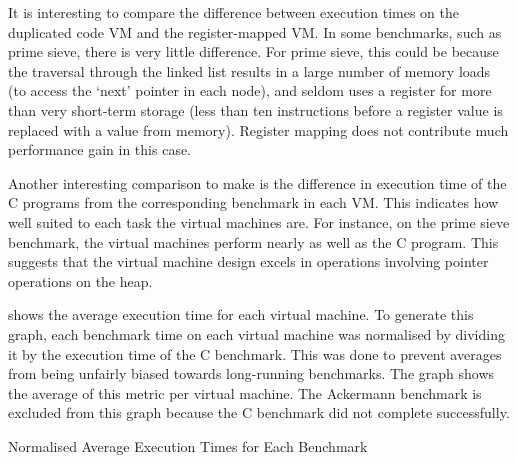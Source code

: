 		It is interesting to compare the difference between execution times on the duplicated code VM and the register-mapped VM. In some benchmarks, such as prime sieve, there is very little difference. For prime sieve, this could be because the traversal through the linked list results in a large number of memory loads (to access the `next' pointer in each node), and seldom uses a register for more than very short-term storage (less than ten instructions before a register value is replaced with a value from memory). Register mapping does not contribute much performance gain in this case.
		
		Another interesting comparison to make is the difference in execution time of the C programs from the corresponding benchmark in each VM. This indicates how well suited to each task the virtual machines are. For instance, on the prime sieve benchmark, the virtual machines perform nearly as well as the C program. This suggests that the virtual machine design excels in operations involving pointer operations on the heap.
		
		 shows the average execution time for each virtual machine. To generate this graph, each benchmark time on each virtual machine was normalised by dividing it by the execution time of the C benchmark. This was done to prevent averages from being unfairly biased towards long-running benchmarks. The graph shows the average of this metric per virtual machine. The Ackermann benchmark is excluded from this graph because the C benchmark did not complete successfully. 
		
		\begin{myfigure}
			\caption{Normalised Average Execution Times for Each Benchmark}
			\label{fig:normaltimes}
		\end{myfigure}
		
